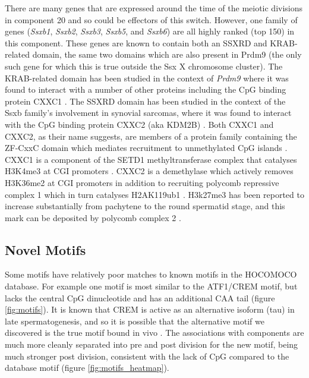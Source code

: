 \label{sec:ssx}
There are many genes that are expressed around the time of the meiotic divisions in component 20 and so could be effectors of this switch. However, one family of genes (\textit{Ssxb1}, \textit{Ssxb2}, \textit{Ssxb3}, \textit{Ssxb5}, and \textit{Ssxb6}) are all highly ranked (top 150) in this component. These genes are known to contain both an SSXRD and KRAB-related domain, the same two domains which are also present in Prdm9 (the only such gene for which this is true outside the Ssx X chromosome cluster). The KRAB-related domain has been studied in the context of \textit{Prdm9} where it was found to interact with a number of other proteins including the CpG binding protein CXXC1 \parencite{Imai2017PRDM9, Parvanov2017PRDM9}. The SSXRD domain has been studied in the context of the Ssxb family's involvement in synovial sarcomas, where it was found to interact with the CpG binding protein CXXC2 (aka KDM2B) \parencite{Banito2018SS18SSX}. Both CXXC1 and CXXC2, as their name suggests, are members of a protein family containing the ZF-CxxC domain which mediates recruitment to unmethylated CpG islands \parencite[reviewed in][]{Long2013ZFCxxC}. CXXC1 is a component of the SETD1 methyltransferase complex that catalyses H3K4me3 at CGI promoters \parencite{Lee2005CpGbinding}. CXXC2 is a demethylase which actively removes H3K36me2 at CGI promoters in addition to recruiting polycomb repressive complex 1 which in turn catalyses H2AK119ub1 \parencite{He2008H3K36, Farcas2012KDM2B, He2013Kdm2b, Wu2013Fbxl10}. H3k27me3 has been reported to increase substantially from pachytene to the round spermatid stage, and this mark can be deposited by polycomb complex 2 \parencite{Sin2015Poised}.


  
\subsection{Novel Motifs}

Some motifs have relatively poor matches to known motifs in the HOCOMOCO database. For example one motif is most similar to the ATF1/CREM motif, but lacks the central CpG dinucleotide and has an additional CAA tail (figure \ref{fig:motifs}). It is known that CREM is active as an alternative isoform (tau) in late spermatogenesis, and so it is possible that the alternative motif we discovered is the true motif bound in vivo \parencite{Sassone-Corsi2000CREM}. The associations with components are much more cleanly separated into pre and post division for the new motif, being much stronger post division, consistent with the lack of CpG compared to the database motif (figure \ref{fig:motifs_heatmap}).



